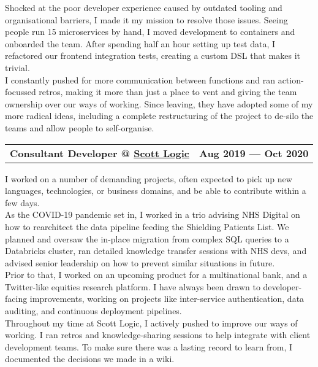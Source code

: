 \documentclass[hidelinks, 12pt, a4paper]{article}
\begin{document}
	\begin{multicols}{2}
		Shocked at the poor developer experience caused by outdated tooling and organisational barriers, I made it my mission to resolve those issues.
		Seeing people run 15 microservices by hand, I moved development to containers and onboarded the team.
		After spending half an hour setting up test data, I refactored our frontend integration tests, creating a custom DSL that makes it trivial.\\
		
		I constantly pushed for more communication between functions and ran action-focussed retros, making it more than just a place to vent and giving the team ownership over our ways of working.
		Since leaving, they have adopted some of my more radical ideas, including a complete restructuring of the project to de-silo the teams and allow people to self-organise.\\
	\end{multicols}

	\begin{tabularx}{\linewidth}{@{}Xr@{}}
		\textbf{Consultant Developer @ \href{https://www.scottlogic.com/}{Scott Logic}} & \textbf{Aug 2019 --- Oct 2020}
	\end{tabularx}\vspace{2pt}
	
	\begin{multicols}{2}
		I worked on a number of demanding projects, often expected to pick up new languages, technologies, or business domains, and be able to contribute within a few days.\\
		
		As the COVID-19 pandemic set in, I worked in a trio advising NHS Digital on how to rearchitect the data pipeline feeding the Shielding Patients List.
		We planned and oversaw the in-place migration from complex SQL queries to a Databricks cluster, ran detailed knowledge transfer sessions with NHS devs, and advised senior leadership on how to prevent similar situations in future.\\
		
		Prior to that, I worked on an upcoming product for a multinational bank, and a Twitter-like equities research platform.
		I have always been drawn to developer-facing improvements, working on projects like inter-service authentication, data auditing, and continuous deployment pipelines.\\
		
		Throughout my time at Scott Logic, I actively pushed to improve our ways of working.
		I ran retros and knowledge-sharing sessions to help integrate with client development teams.
		To make sure there was a lasting record to learn from, I documented the decisions we made in a wiki.\\
	\end{multicols}
\end{document}
